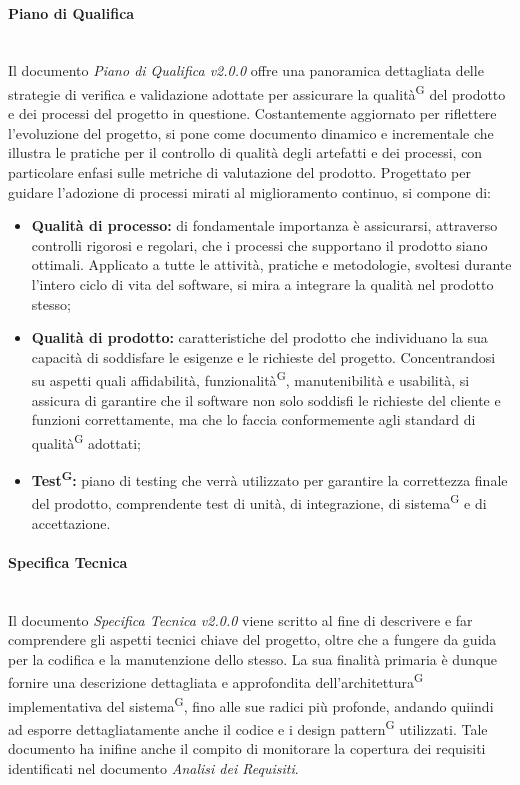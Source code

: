 \documentclass[8pt]{article}
\newcommand{\glossterm}[1]{#1\textsuperscript{G}} %
\newcommand{\subsubsubsection}[1]{\paragraph{#1}\mbox{}\\}
\begin{document}
\subsubsubsection{Piano di Qualifica}
Il documento \textit{Piano di Qualifica v2.0.0} offre una panoramica dettagliata delle strategie di verifica e validazione adottate per assicurare la \glossterm{qualità} del prodotto e dei processi del progetto in questione. Costantemente aggiornato per riflettere l'evoluzione del progetto, si pone come documento dinamico e incrementale che illustra le pratiche per il controllo di qualità degli artefatti e dei processi, con particolare enfasi sulle metriche di valutazione del prodotto. Progettato per guidare l'adozione di processi mirati al miglioramento continuo, si compone di:
\begin{itemize}
    \item \textbf{Qualità di processo:} di fondamentale importanza è assicurarsi, attraverso controlli rigorosi e regolari, che i processi che supportano il prodotto siano ottimali. Applicato a tutte le attività, pratiche e metodologie, svoltesi durante l'intero ciclo di vita del software, si mira a integrare la qualità nel prodotto stesso;
    \item \textbf{Qualità di prodotto:} caratteristiche del prodotto che individuano la sua capacità di soddisfare le esigenze e le richieste del progetto. Concentrandosi su aspetti quali affidabilità, \glossterm{funzionalità}, manutenibilità e usabilità, si assicura di garantire che il software non solo soddisfi le richieste del cliente e funzioni correttamente, ma che lo faccia conformemente agli standard di \glossterm{qualità} adottati;
    \item \textbf{\glossterm{Test}:} piano di testing che verrà utilizzato per garantire la correttezza finale del prodotto, comprendente test di unità, di integrazione, di \glossterm{sistema} e di accettazione.
\end{itemize} 

\subsubsubsection{Specifica Tecnica} \label{sec:specifica_tecnica}
Il documento \textit{Specifica Tecnica v2.0.0} viene scritto al fine di descrivere e far comprendere gli aspetti
tecnici chiave del progetto, oltre che a fungere da guida per la codifica e la manutenzione dello stesso. La sua finalità primaria è dunque fornire una descrizione
dettagliata e approfondita dell'\glossterm{architettura} implementativa del \glossterm{sistema}, fino alle sue radici più profonde, andando quiindi ad esporre dettagliatamente anche il codice e i \glossterm{design pattern} utilizzati. 
Tale documento ha inifine anche il compito di monitorare la copertura dei requisiti identificati nel documento \textit{Analisi dei Requisiti}.
\end{document}
